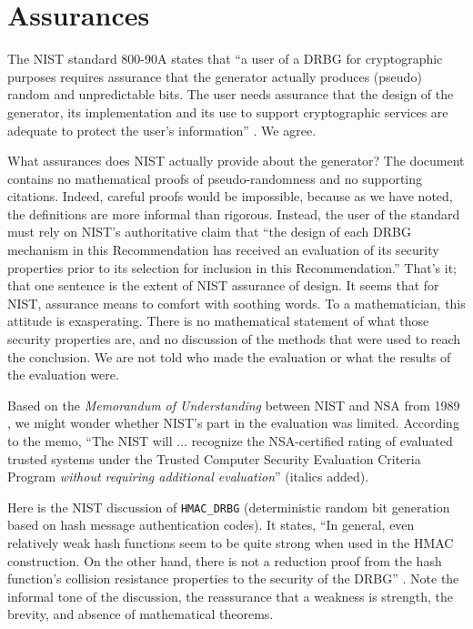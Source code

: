 \documentclass[11pt]{amsart} %
\begin{document}
\section{Assurances}

The NIST standard 800-90A states that ``a user of a DRBG for cryptographic purposes requires assurance
that the generator actually produces (pseudo) random and unpredictable bits.  The user needs assurance
that the design of the generator, its implementation and its use to support cryptographic services are
adequate to protect the user's information'' \cite{NIST}. We agree.

What assurances does NIST actually provide about the generator?  
The document contains no mathematical proofs of pseudo-randomness and no supporting citations.  
Indeed, careful proofs would be impossible,
because as we have noted,
the definitions are more informal than rigorous.  Instead, the user of the standard must
rely on NIST's authoritative claim that ``the design of each DRBG mechanism in this Recommendation has
received an evaluation of its security properties prior to its selection for inclusion in this Recommendation.''
That's it;  that one sentence is the extent of NIST assurance of design.   It seems that for NIST,
assurance means to comfort with soothing words. To a mathematician, this attitude is exasperating.
 There is no mathematical statement of what
those security properties are, and no discussion of the methods that were used to reach the conclusion.
We are not told who made the evaluation or what the results of the evaluation were.

Based on the {\it Memorandum of Understanding} between NIST and NSA from 1989 \cite[p.601]{ScAC}, we might
wonder whether NIST's part in the evaluation was limited.
According to the memo, ``The NIST will $\ldots$ recognize the NSA-certified rating of evaluated trusted
systems under the Trusted Computer Security Evaluation Criteria Program {\it without requiring additional
evaluation}'' (italics added). 

Here is the NIST discussion of {\tt HMAC\_DRBG}
(deterministic random bit generation based on hash message authentication codes).  It states, ``In general, even
relatively weak hash functions seem to be quite strong when used in the HMAC construction.
On the other hand, there is not a reduction proof from the hash function's collision resistance
properties to the security of the DRBG'' \cite[Appendix E.2]{NIST}. 
Note the informal tone of the discussion, the  reassurance
that a weakness is strength, the brevity, and absence of mathematical theorems.  
\end{document}
